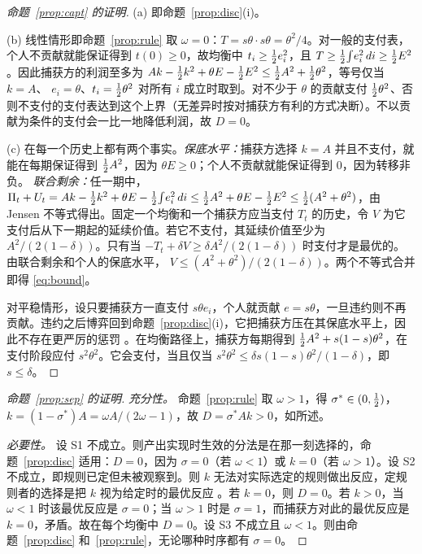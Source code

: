 \begin{proof}[命题~\ref{prop:capt} 的证明]
(a) 即命题~\ref{prop:disc}(i)。

(b) 线性情形即命题~\ref{prop:rule} 取 $\omega=0$：$T=s\theta\cdot s\theta=\theta^2/4$。对一般的支付表，个人不贡献就能保证得到 $t(0)\ge 0$，故均衡中 $t_i\ge\tfrac{1}{2} e_i^2$，且
$T\ge\tfrac{1}{2}\!\int\! e_i^2\,di\ge\tfrac{1}{2} E^2$。因此捕获方的利润至多为
$Ak-\tfrac{1}{2} k^2+\theta E-\tfrac{1}{2} E^2\le\tfrac{1}{2} A^2+\tfrac{1}{2}\theta^2$，等号仅当 $k=A$、
$e_i=\theta$、$t_i=\tfrac{1}{2}\theta^2$ 对所有 $i$ 成立时取到。对不少于 $\theta$ 的贡献支付
$\tfrac{1}{2}\theta^2$、否则不支付的支付表达到这个上界（无差异时按对捕获方有利的方式决断）。不以贡献为条件的支付会一比一地降低利润，故 $D=0$。

(c) 在每一个历史上都有两个事实。\emph{保底水平：}捕获方选择 $k=A$ 并且不支付，就能在每期保证得到 $\tfrac{1}{2} A^2$，因为 $\theta E\ge 0$；个人不贡献就能保证得到 $0$，因为转移非负。
\emph{联合剩余：}任一期中，$\Pi_t+U_t=Ak-\tfrac{1}{2} k^2+\theta E-\tfrac{1}{2}\!\int\!
e_i^2\,di\le\tfrac{1}{2} A^2+\theta E-\tfrac{1}{2} E^2\le\tfrac{1}{2}(A^2+\theta^2)$，由 Jensen 不等式得出。固定一个均衡和一个捕获方应当支付 $T_t$ 的历史，令 $V$ 为它支付后从下一期起的延续价值。若它不支付，其延续价值至少为 $A^2/(2(1-\delta))$。只有当
$-T_t+\delta V\ge\delta A^2/(2(1-\delta))$ 时支付才是最优的。由联合剩余和个人的保底水平，
$V\le(A^2+\theta^2)/(2(1-\delta))$。两个不等式合并即得 \eqref{eq:bound}。

对平稳情形，设只要捕获方一直支付 $s\theta e_i$，个人就贡献 $e=s\theta$，一旦违约则不再贡献。违约之后博弈回到命题~\ref{prop:disc}(i)，它把捕获方压在其保底水平上，因此不存在更严厉的惩罚 \citep{Abreu1988}。在均衡路径上，捕获方每期得到 $\tfrac{1}{2} A^2+s(1-s)\theta^2$，在支付阶段应付 $s^2\theta^2$。它会支付，当且仅当
$s^2\theta^2\le\delta s(1-s)\theta^2/(1-\delta)$，即 $s\le\delta$。
\end{proof}

\begin{proof}[命题~\ref{prop:sep} 的证明]
\emph{充分性。} 命题~\ref{prop:rule} 取 $\omega>1$，得 $\sigma^*\in(0,\tfrac{1}{2})$，
$k=(1-\sigma^*)A=\omega A/(2\omega-1)$，故 $D=\sigma^*Ak>0$，如所述。

\emph{必要性。} 设 S1 不成立。则产出实现时生效的分法是在那一刻选择的，命题~\ref{prop:disc} 适用：$D=0$，因为 $\sigma=0$（若 $\omega<1$）或 $k=0$（若
$\omega>1$）。设 S2 不成立，即规则已定但未被观察到。则 $k$ 无法对实际选定的规则做出反应，定规则者的选择是把 $k$ 视为给定时的最优反应 \citep{Bagwell1995}。若 $k=0$，则 $D=0$。若 $k>0$，当 $\omega<1$ 时该最优反应是 $\sigma=0$；当 $\omega>1$ 时是 $\sigma=1$，而捕获方对此的最优反应是 $k=0$，矛盾。故在每个均衡中 $D=0$。设 S3 不成立且 $\omega<1$。则由命题~\ref{prop:disc} 和~\ref{prop:rule}，无论哪种时序都有 $\sigma=0$。
\end{proof}

